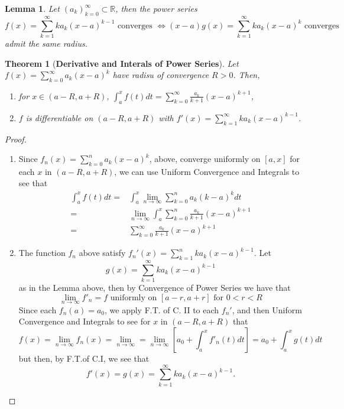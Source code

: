 \documentclass[12pt]{article}
\theoremstyle{plain}
\newtheorem{theorem}{Theorem}[subsection]
\newtheorem{lemma}{Lemma}[subsection]
\newcommand{\mR}{{\mathbb{R}}}
\begin{document}
\begin{lemma}
	Let $(a_k)^{\infty}_{k=0} \subset \mR$, then the power series
	\[
	f(x) = \sum_{k=1}^{\infty} k a_k (x-a)^{k-1} 
	\text{ converges } 
	\Leftrightarrow (x-a)g(x) = \sum_{k=1}^{\infty} ka_k(x-a)^k 
	\text{ converges} 
	\]
	admit the same radius. 
\end{lemma}



\begin{theorem}[\textbf{Derivative and Interals of Power Series}]
	Let $f(x) = \sum_{k=0}^{\infty} a_k (x-a)^k$ have radisu of convergence 
	$R > 0$. Then, 
	\begin{enumerate}
		\item for $x \in (a-R, a+R)$, $\int_a^x f(t) dt = \sum_{k=0}^{\infty}
			\frac{a_k}{k+1} (x-a)^{k+1}$, 
		\item $f$ is differentiable on $(a-R, a+R)$ with $f'(x) = \sum_{k=1}
			^{\infty} ka_k (x-a)^{k-1}$. 
	\end{enumerate}
\end{theorem}
\begin{proof}
	\begin{enumerate}
		\item Since $f_n(x) = \sum_{k=0}^n a_k(x-a)^k$, above, converge 
			uniformly on $[a,x]$ for each $x$ in $(a-R, a+R)$, we can use 
			Uniform Convergence and Integrals to see that
			\begin{align*}
				\int_a^x f(t) dt 
				=& \int_a^x \lim_{n\to\infty} \sum_{k=0}^n a_k (k-a)^k dt 
				\\
				=& \lim_{n\to\infty} \int_a^x \sum_{k=0}^n \frac{a_k}{k+1}
				(x-a)^{k+1}
				\\
				=& \sum_{k=0}^{\infty} \frac{a_k}{k+1} (x-a)^{k+1} 
			\end{align*}

		\item The function $f_n$ above satisfy $f_n'(x) = \sum_{k=1}^n ka_k
			(x-a)^{k-1}$. Let 
			\[
				g(x) = \sum_{k=1}^{\infty} k a_k (x-a)^{k-1}
			\]
			as in the Lemma above, then by Convergence of Power Series we have
			that 
			\[
				\lim_{n\to\infty} f'_n = f 
				\text{ uniformly on } [a-r, a+r] 
				\text{ for } 0 < r < R
			\]
			Since each $f_n(a) = a_0$, we apply F.T. of C. II to each
			$f_n'$, and then Uniform Convergence and Integrals to see for $x$
			in $(a-R, a+R)$ that 
			\[
				f(x) = \lim_{n\to\infty} f_n(x) = \lim_{n\to\infty} 
				= \lim_{n\to\infty} [a_0 + \int_a^x f'_n(t)dt]
				= a_0 + \int_a^ x g(t) dt
			\]
			but then, by F.T.of C.I, we see that
			\[
				f'(x) = g(x) = \sum_{k=1}^{\infty} ka_k (x-a)^{k-1} .
			\]	
	\end{enumerate}
\end{proof}
\end{document}
